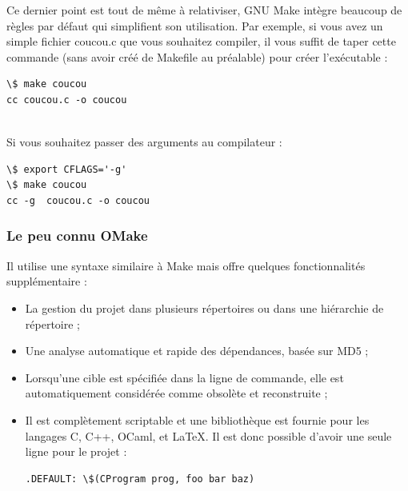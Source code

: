 \documentclass[11pt,twoside,a4paper]{article}
\begin{document}
Ce dernier point est tout de m{\^e}me {\`a} relativiser, GNU Make int{\`e}gre beaucoup de r{\`e}gles par d{\'e}faut qui simplifient son utilisation. Par exemple, si vous avez un simple fichier coucou.c que vous souhaitez compiler, il vous suffit de taper cette commande (sans avoir cr{\'e}{\'e} de Makefile au pr{\'e}alable) pour cr{\'e}er l'ex{\'e}cutable :

		\begin{verbatim}
\$ make coucou
cc coucou.c -o coucou
		\end{verbatim}~\\

Si vous souhaitez passer des arguments au compilateur :

		\begin{verbatim}
\$ export CFLAGS='-g'
\$ make coucou
cc -g  coucou.c -o coucou
		\end{verbatim}

\subsubsection{Le peu connu OMake}

Il utilise une syntaxe similaire {\`a} Make mais offre quelques fonctionnalit{\'e}s suppl{\'e}mentaire :
\begin{itemize}
	\item La gestion du projet dans plusieurs r{\'e}pertoires ou dans une hi{\'e}rarchie de r{\'e}pertoire ;
	\item Une analyse automatique et rapide des d{\'e}pendances, bas{\'e}e sur MD5 ;
	\item Lorsqu'une cible est sp{\'e}cifi{\'e}e dans la ligne de commande, elle est automatiquement consid{\'e}r{\'e}e comme obsol{\`e}te et reconstruite ;
	\item Il est compl{\`e}tement scriptable et une biblioth{\`e}que est fournie pour les langages C, C++, OCaml, et LaTeX. Il est donc possible d'avoir une seule ligne pour le projet :
			\begin{verbatim}
.DEFAULT: \$(CProgram prog, foo bar baz)
		\end{verbatim}~\\
\end{itemize}~\\
\end{document}
